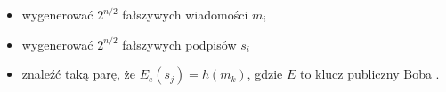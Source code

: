 \documentclass[wi]{zut}
\begin{document}
\begin{itemize}
    \item wygenerować $2^{n/2}$ fałszywych wiadomości $m_i$
    \item wygenerować $2^{n/2}$ fałszywych podpisów $s_i$
    \item znaleźć taką parę, że $E_e(s_j) = h(m_k)$, gdzie $E$ to klucz publiczny Boba \cite{Chocian2020}.
\end{itemize}







\end{document}
